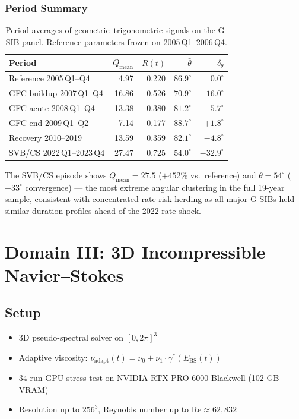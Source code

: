 \documentclass[11pt,a4paper]{article}
\newcommand{\Ebs}{E_{\mathrm{BS}}}
\begin{document}
\subsubsection{Period Summary}

\begin{table}[H]
\centering
\caption{Period averages of geometric--trigonometric signals on the
  G-SIB panel.  Reference parameters frozen on 2005\,Q1--2006\,Q4.}
\label{tab:period_gsib}
\small\renewcommand{\arraystretch}{1.12}
\begin{tabular}{@{}lrrrr@{}}
\toprule
\textbf{Period} & $Q_{\mathrm{mean}}$ & $R(t)$ & $\bar\theta$ & $\delta_\theta$ \\
\midrule
Reference 2005\,Q1--Q4 & 4.97 & 0.220 & $86.9^\circ$ & $0.0^\circ$ \\
GFC buildup 2007\,Q1--Q4 & 16.86 & 0.526 & $70.9^\circ$ & $-16.0^\circ$ \\
GFC acute 2008\,Q1--Q4  & 13.38 & 0.380 & $81.2^\circ$ & $-5.7^\circ$ \\
GFC end 2009\,Q1--Q2    &  7.14 & 0.177 & $88.7^\circ$ & $+1.8^\circ$ \\
Recovery 2010--2019      & 13.59 & 0.359 & $82.1^\circ$ & $-4.8^\circ$ \\
SVB/CS 2022\,Q1--2023\,Q4 & 27.47 & 0.725 & $54.0^\circ$ & $-32.9^\circ$ \\
\bottomrule
\end{tabular}
\end{table}

The SVB/CS episode shows $Q_{\mathrm{mean}}=27.5$ ($+452\%$ vs.\
reference) and $\bar\theta=54^\circ$ ($-33^\circ$ convergence) ---
the most extreme angular clustering in the full 19-year sample,
consistent with concentrated rate-risk herding as all major G-SIBs
held similar duration profiles ahead of the 2022 rate shock.


\section{Domain III: 3D Incompressible Navier--Stokes}\label{sec:ns}

\subsection{Setup}
\begin{itemize}[nosep]
  \item 3D pseudo-spectral solver on $[0, 2\pi]^3$
  \item Adaptive viscosity: $\nu_{\mathrm{adapt}}(t) = \nu_0 + \nu_1 \cdot \gamma^*(\Ebs(t))$
  \item 34-run GPU stress test on NVIDIA RTX PRO 6000 Blackwell (102 GB VRAM)
  \item Resolution up to $256^3$, Reynolds number up to $\mathrm{Re} \approx 62{,}832$
\end{itemize}
\end{document}
